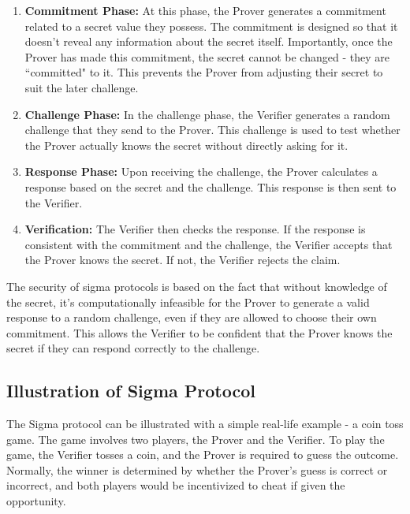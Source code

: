 \begin{enumerate}
    \item \textbf{Commitment Phase:} At this phase, the Prover generates a commitment related to a secret value they possess. The commitment is designed so that it doesn't reveal any information about the secret itself. Importantly, once the Prover has made this commitment, the secret cannot be changed - they are ``committed" to it. This prevents the Prover from adjusting their secret to suit the later challenge.
    
    \item \textbf{Challenge Phase:} In the challenge phase, the Verifier generates a random challenge that they send to the Prover. This challenge is used to test whether the Prover actually knows the secret without directly asking for it.
    
    \item \textbf{Response Phase:} Upon receiving the challenge, the Prover calculates a response based on the secret and the challenge. This response is then sent to the Verifier.
    
    \item \textbf{Verification:} The Verifier then checks the response. If the response is consistent with the commitment and the challenge, the Verifier accepts that the Prover knows the secret. If not, the Verifier rejects the claim.
\end{enumerate}

The security of sigma protocols is based on the fact that without knowledge of the secret, it's computationally infeasible for the Prover to generate a valid response to a random challenge, even if they are allowed to choose their own commitment. This allows the Verifier to be confident that the Prover knows the secret if they can respond correctly to the challenge.


\subsection{Illustration of Sigma Protocol}

The Sigma protocol can be illustrated with a simple real-life example - a coin toss game. The game involves two players, the Prover and the Verifier. To play the game, the Verifier tosses a coin, and the Prover is required to guess the outcome. Normally, the winner is determined by whether the Prover's guess is correct or incorrect, and both players would be incentivized to cheat if given the opportunity.

